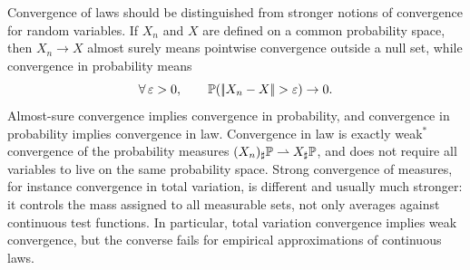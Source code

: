 \begin{rem}\label{rem-random-variable-convergences}
	Convergence of laws should be distinguished from stronger notions of convergence for random variables. If $X_n$ and $X$ are defined on a common probability space, then $X_n\to X$ almost surely means pointwise convergence outside a null set, while convergence in probability means
	\[
		\foralls \epsilon>0,\qquad
		\PP(\norm{X_n-X}>\epsilon)\to0.
	\]
	Almost-sure convergence implies convergence in probability, and convergence in probability implies convergence in law. Convergence in law is exactly weak$^*$ convergence of the probability measures $(X_n)_\sharp\mathbb{P}\rightharpoonup X_\sharp\mathbb{P}$, and does not require all variables to live on the same probability space. Strong convergence of measures, for instance convergence in total variation, is different and usually much stronger: it controls the mass assigned to all measurable sets, not only averages against continuous test functions. In particular, total variation convergence implies weak convergence, but the converse fails for empirical approximations of continuous laws.
\end{rem}


